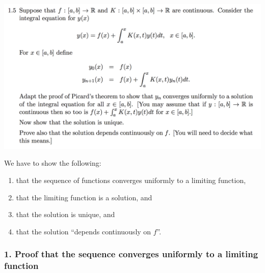 \documentclass[12pt]{article}
\begin{document}

\newpage
\subsection*{}  %
\begin{mdframed}
\includegraphics[width=400pt]{img/differential-equations-a1-1-5.png}
\end{mdframed}

We have to show the following:
\begin{enumerate}
\item that the sequence of functions converges uniformly to a limiting function,
\item that the limiting function is a solution, and
\item that the solution is unique, and
\item that the solution ``depends continuously on $f$''.
\end{enumerate}

\subsubsection*{1. Proof that the sequence converges uniformly to a limiting function}
\end{document}

